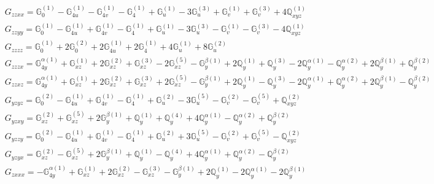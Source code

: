 \documentclass[fleqn,8pt,landscape]{jsarticle}
\begin{document}
\begin{align*}
& G_{zzxx} = \mathbb{G}_{0}^{(1)} - \mathbb{G}_{4u}^{(1)} - \mathbb{G}_{4v}^{(1)} - \mathbb{G}_{4}^{(1)} + \mathbb{G}_{u}^{(1)} - 3 \mathbb{G}_{u}^{(3)} + \mathbb{G}_{v}^{(1)} + \mathbb{G}_{v}^{(3)} + 4 \mathbb{Q}_{xyz}^{(1)} \\
& G_{zzyy} = \mathbb{G}_{0}^{(1)} - \mathbb{G}_{4u}^{(1)} + \mathbb{G}_{4v}^{(1)} - \mathbb{G}_{4}^{(1)} + \mathbb{G}_{u}^{(1)} - 3 \mathbb{G}_{u}^{(3)} - \mathbb{G}_{v}^{(1)} - \mathbb{G}_{v}^{(3)} - 4 \mathbb{Q}_{xyz}^{(1)} \\
& G_{zzzz} = \mathbb{G}_{0}^{(1)} + 2 \mathbb{G}_{0}^{(2)} + 2 \mathbb{G}_{4u}^{(1)} + 2 \mathbb{G}_{4}^{(1)} + 4 \mathbb{G}_{u}^{(1)} + 8 \mathbb{G}_{u}^{(2)} \\
& G_{zzzx} = \mathbb{G}_{4y}^{\alpha(1)} + \mathbb{G}_{xz}^{(1)} + 2 \mathbb{G}_{xz}^{(2)} + \mathbb{G}_{xz}^{(3)} - 2 \mathbb{G}_{xz}^{(5)} - \mathbb{G}_{y}^{\beta(1)} + 2 \mathbb{Q}_{y}^{(1)} + \mathbb{Q}_{y}^{(3)} - 2 \mathbb{Q}_{y}^{\alpha(1)} - \mathbb{Q}_{y}^{\alpha(2)} + 2 \mathbb{Q}_{y}^{\beta(1)} + \mathbb{Q}_{y}^{\beta(2)} \\
& G_{zzxz} = \mathbb{G}_{4y}^{\alpha(1)} + \mathbb{G}_{xz}^{(1)} + 2 \mathbb{G}_{xz}^{(2)} + \mathbb{G}_{xz}^{(3)} + 2 \mathbb{G}_{xz}^{(5)} - \mathbb{G}_{y}^{\beta(1)} + 2 \mathbb{Q}_{y}^{(1)} - \mathbb{Q}_{y}^{(3)} - 2 \mathbb{Q}_{y}^{\alpha(1)} + \mathbb{Q}_{y}^{\alpha(2)} + 2 \mathbb{Q}_{y}^{\beta(1)} - \mathbb{Q}_{y}^{\beta(2)} \\
& G_{yzyz} = \mathbb{G}_{0}^{(2)} - \mathbb{G}_{4u}^{(1)} + \mathbb{G}_{4v}^{(1)} - \mathbb{G}_{4}^{(1)} + \mathbb{G}_{u}^{(2)} - 3 \mathbb{G}_{u}^{(5)} - \mathbb{G}_{v}^{(2)} - \mathbb{G}_{v}^{(5)} + \mathbb{Q}_{xyz}^{(2)} \\
& G_{yzxy} = \mathbb{G}_{xz}^{(2)} + \mathbb{G}_{xz}^{(5)} + 2 \mathbb{G}_{y}^{\beta(1)} + \mathbb{Q}_{y}^{(1)} + \mathbb{Q}_{y}^{(4)} + 4 \mathbb{Q}_{y}^{\alpha(1)} - \mathbb{Q}_{y}^{\alpha(2)} + \mathbb{Q}_{y}^{\beta(2)} \\
& G_{yzzy} = \mathbb{G}_{0}^{(2)} - \mathbb{G}_{4u}^{(1)} + \mathbb{G}_{4v}^{(1)} - \mathbb{G}_{4}^{(1)} + \mathbb{G}_{u}^{(2)} + 3 \mathbb{G}_{u}^{(5)} - \mathbb{G}_{v}^{(2)} + \mathbb{G}_{v}^{(5)} - \mathbb{Q}_{xyz}^{(2)} \\
& G_{yzyx} = \mathbb{G}_{xz}^{(2)} - \mathbb{G}_{xz}^{(5)} + 2 \mathbb{G}_{y}^{\beta(1)} + \mathbb{Q}_{y}^{(1)} - \mathbb{Q}_{y}^{(4)} + 4 \mathbb{Q}_{y}^{\alpha(1)} + \mathbb{Q}_{y}^{\alpha(2)} - \mathbb{Q}_{y}^{\beta(2)} \\
& G_{zxxx} = - \mathbb{G}_{4y}^{\alpha(1)} + \mathbb{G}_{xz}^{(1)} + 2 \mathbb{G}_{xz}^{(2)} - \mathbb{G}_{xz}^{(3)} - \mathbb{G}_{y}^{\beta(1)} + 2 \mathbb{Q}_{y}^{(1)} - 2 \mathbb{Q}_{y}^{\alpha(1)} - 2 \mathbb{Q}_{y}^{\beta(1)} \\

\end{align*}
\end{document}
